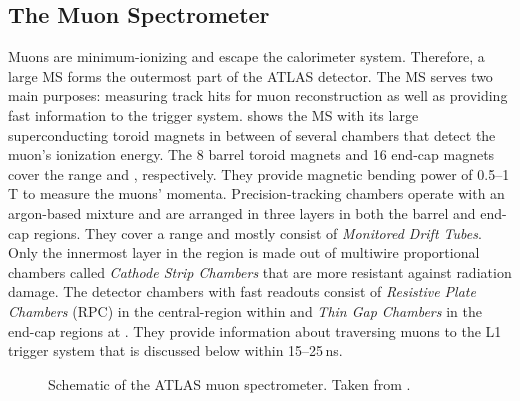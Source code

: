 \subsection{The Muon Spectrometer}
Muons are minimum-ionizing and escape the calorimeter system. 
Therefore, a large MS forms the outermost part of the ATLAS detector. 
The MS serves two main purposes: measuring track hits for muon reconstruction as well as providing fast information to the trigger system.
 shows the MS with its large superconducting toroid magnets in between of several chambers that detect the muon's ionization energy.
The 8 barrel toroid magnets and 16 end-cap magnets cover the range  and , respectively. They provide magnetic bending power of \numrange{0.5}{1}\,T to measure the muons' momenta. Precision-tracking chambers operate with an argon-based mixture and are arranged in three layers in both the barrel and end-cap regions. They cover a range  and mostly consist of \emph{Monitored Drift Tubes}. Only the innermost layer in the region  is made out of multiwire proportional chambers called \emph{Cathode Strip Chambers} that are more resistant against radiation damage. The detector chambers with fast readouts consist of \emph{Resistive Plate Chambers} (RPC) in the central-region within  and \emph{Thin Gap Chambers} in the end-cap regions at . They provide information about traversing muons to the L1 trigger system that is discussed below within \numrange{15}{25}\,ns.



\begin{figure}
    \caption{Schematic of the ATLAS muon spectrometer. Taken from .}
    \label{fig:ATLASmuonspectrometer}
\end{figure}


